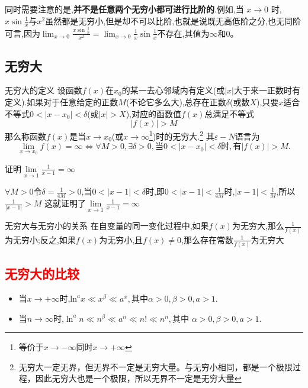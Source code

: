 \documentclass[12pt, a4paper, oneside, UTF8]{ctexbook}  %
\begin{document}
\begin{sloppypar}
    同时需要注意的是,\textbf{并不是任意两个无穷小都可进行比阶的}.例如,当 $x\to 0$ 时,$x\sin\frac1x$与$x^2$虽然都是无穷小,但是却不可以比阶,也就是说既无高低阶之分,也无同阶可言,因为$\lim_{x \to 0}\frac{x \sin \frac{1}{x}}{x^2}=\lim_{x\to0}\frac1x\sin\frac1x$不存在,其值为$\infty$和$0$。
    \subsection{无穷大}
    \begin{defn}{无穷大的定义}{}
        设函数$f(x)$在$x_0$的某一去心邻域内有定义(或$|x|$大于来一正数时有定义).如果对于任意给定的正数$M$(不论它多么大),总存在正数$\delta$(或数$X$),只要$x$适合不等式$0<|x-x_0|<\delta$(或$|x|>X$),对应的函数值$f(x)$总满足不等式
        $$
            |f(x)|>M
        $$
        那么称函数$f(x)$是当$x\to x_0$(或$x\to\infty$\footnote{等价于$x \to -\infty$同时$x \to +\infty$})时的无穷大.\footnote{无穷大一定无界，但无界不一定是无穷大量。与无穷小相同，都是一个极限过程，因此无穷大也是一个极限，所以无界不一定是无穷大量}
        其$\varepsilon-N$语言为
        $$
            \lim\limits_{x\to x_0}f(x)= \infty \Leftrightarrow\forall M >0,\exists\delta>0,\text{当}0<|x-x_0|<\delta\text{时},\text{有}|f(x)|>M.
        $$
    \end{defn}
    \begin{problem}
    证明$\underset{x\rightarrow1}{\operatorname*{lim}}\frac{1}{x-1}=\infty $
    \end{problem}
    \begin{solution}
        $\forall M>0$令$\delta=\frac{1}{4M}>0$,当$0<|x-1|<\delta$时,即$0<|x-1|<\frac{1}{4M}$时,$|x-1|<\frac{1}{M}$,所以$\frac{1}{|x-1|}>M$
        这就证明了$\underset{x\rightarrow1}{\operatorname*{lim}}\frac{1}{x-1}=\infty$
    \end{solution}
    \begin{criterion}{无穷大与无穷小的关系}{}
        在自变量的同一变化过程中,如果$f(x)$为无穷大,那么$\frac{1}{f(x)}$为无穷小;反之,如果$f(x)$为无穷小,且$f(x) \neq 0$,那么存在常数$\frac{1}{f(x)}为无穷大$
    \end{criterion}
    \subsection{\textcolor{red}{无穷大的比较}}
    \begin{itemize}
        \item 当$x \to +\infty$时,$\mathrm{ln}^ax\ll x^\beta\ll a^x,\text{其中}\alpha>0,\beta>0,a>1.$
        \item 当$n \to \infty$时,$\ln^an\ll n^\beta\ll a^n\ll n!\ll n^n,\text{其中 }\alpha>0,\beta>0,a>1.$
    \end{itemize}

\end{sloppypar}
\end{document}
